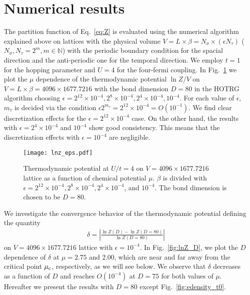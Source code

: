 \documentclass[nofootinbib,prd,aps,superscriptaddress,preprintnumbers,twocolumn,showpacs]{revtex4-1}
\begin{document}
\section{Numerical results} 
\label{sec:results}
 

The partition function of Eq.~\eqref{eq:Z} is evaluated using the numerical algorithm explained above on lattices with the physical volume $V=L\times \beta=N_{\sigma}\times (\epsilon N_\tau)$ ($N_{\sigma}, N_\tau=2^m, m \in \mathbb{N}$) with the periodic boundary condition for the spacial direction and the anti-periodic one for the temporal direction.
We employ  $t=1$ for the hopping parameter and $U=4$ for the four-fermi coupling. In Fig.~\ref{fig:lnZ_delbeta} we plot the $\mu$ dependence of the thermodynamic potential $\ln Z/V$ on $V=L\times\beta=4096\times 1677.7216$ with the bond dimension $D=80$ in the HOTRG algorithm choosing $\epsilon=2^{12}\times10^{-4},2^{8}\times10^{-4},2^{4}\times10^{-4},10^{-4}$. For each value of $\epsilon$, $m_{\tau}$ is decided via the condition $\epsilon 2^{m_{\tau}}=2^{12}\times10^{-4}=O(10^{-1})$. We find clear discretization effects for the $\epsilon=2^{12}\times10^{-4}$ case. On the other hand, the results with $\epsilon=2^{4}\times10^{-4}$ and $10^{-4}$ show good consistency. This means that the discretization effects with $\epsilon=10^{-4}$ are negligible. 
%
\begin{figure}[htbp]
	\centering
	\texttt{[image: lnz\_eps.pdf]}
 	\caption{Thermodynamic potential at $U/t=4$ on $V=4096\times 1677.7216$ lattice as a function of chemical potential $\mu$. $\beta$ is divided with $\epsilon=2^{12}\times10^{-4},2^{8}\times10^{-4},2^{4}\times10^{-4}$, and $10^{-4}$. The bond dimension is chosen to be $D=80$.}
  	\label{fig:lnZ_delbeta}
\end{figure}

We investigate the convergence behavior of the thermodynamic potential defining the quantity
\begin{align}
	\delta=\left|\frac{\ln Z(D)-\ln Z(D=80)}{\ln Z(D=80)}\right|
\label{eq:delta}
\end{align}
on $V=4096\times 1677.7216$ lattice with $\epsilon=10^{-4}$. In Fig.~\ref{fig:lnZ_D}, we plot the $D$ dependence of $\delta$  at $\mu=2.75$ and 2.00, which are near and far away from the critical point $\mu_{\rm c}$, respectively, as we will see below. We observe that $\delta$ decreases as a function of $D$ and reaches  $O(10^{-4})$ at $D=75$ for both values of $\mu$. Hereafter we present the results with $D=80$ except Fig.~\ref{fig:edensity_t0}.
\end{document}
